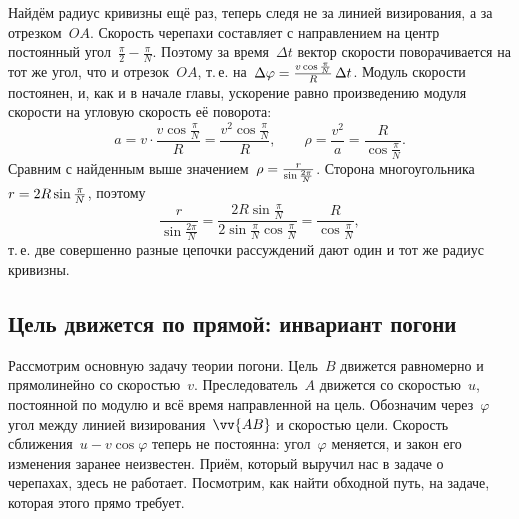 \documentclass[../main.tex]{subfiles}
\begin{document}
\begin{example}
Найдём радиус кривизны ещё раз, теперь следя не за линией визирования, а за
отрезком~$OA$. Скорость черепахи составляет с направлением на центр постоянный угол~$\frac{\pi}{2} - \frac{\pi}{N}$. Поэтому за время~$\Delta t$ вектор скорости
поворачивается на тот же угол, что и отрезок~$OA$, т.\,е. на~$\Delta\varphi \hm= \frac{v\cos\frac{\pi}{N}}{R}\,\Delta t$. Модуль скорости постоянен,
и, как и в начале главы, ускорение равно произведению модуля скорости на угловую
скорость её поворота:
\[
a = v\cdot\frac{v\cos\frac{\pi}{N}}{R} = \frac{v^2\cos\frac{\pi}{N}}{R},
\qquad
\rho = \frac{v^2}{a} = \frac{R}{\cos\frac{\pi}{N}}.
\]
Сравним с найденным выше значением~$\rho \hm= \frac{r}{\sin\frac{2\pi}{N}}$. Сторона
многоугольника~$r \hm= 2R\sin\frac{\pi}{N}$, поэтому
\[
\frac{r}{\sin\frac{2\pi}{N}} = \frac{2R\sin\frac{\pi}{N}}{2\sin\frac{\pi}{N}\cos\frac{\pi}{N}}
= \frac{R}{\cos\frac{\pi}{N}},
\]
т.\,е. две совершенно разные цепочки рассуждений дают один и тот же радиус кривизны.
\end{example}

\subsection{Цель движется по прямой: инвариант погони}

Рассмотрим основную задачу теории погони. Цель~$B$ движется равномерно и
прямолинейно со скоростью~$v$. Преследователь~$A$ движется со скоростью~$u$,
постоянной по модулю и всё время направленной на цель. Обозначим через~$\varphi$
угол между линией визирования~$\vv{AB}$ и скоростью цели. Скорость сближения~$u - v\cos\varphi$ теперь не постоянна: угол~$\varphi$ меняется, и закон его изменения
заранее неизвестен. Приём, который выручил нас в задаче о черепахах, здесь не
работает. Посмотрим, как найти обходной путь, на задаче, которая этого прямо требует.
\end{document}
